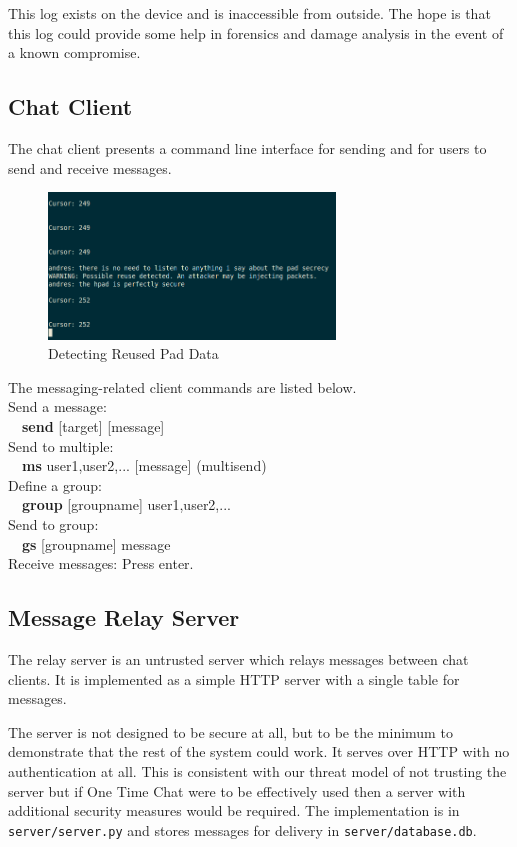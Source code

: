 \documentclass[twocolumn]{article}
\begin{document}
This log exists on the device and is inaccessible from outside.
The hope is that this log could provide some help in forensics
and damage analysis in the event of a known compromise.


\subsection{Chat Client}
The chat client presents a command line interface for sending and
 for users to send and receive messages.


\begin{figure}[htp]
\centering
\includegraphics[width=3in]{reuse}
\caption{Detecting Reused Pad Data}
\end{figure}

The messaging-related client commands are listed below.\\
Send a message:\\
\-\ \-\ \textbf{send} [target] [message]\\
Send to multiple:\\
\-\ \-\ \textbf{ms} user1,user2,... [message] (multisend)\\
Define a group:\\
\-\ \-\ \textbf{group} [groupname] user1,user2,...\\
Send to group:\\
\-\ \-\ \textbf{gs} [groupname] message\\
Receive messages:
Press enter.


\subsection{Message Relay Server}
The relay server is an untrusted server which relays messages between chat clients.
It is implemented as a simple HTTP server with a single table for messages.

The server is not designed to be secure at all, but to be the minimum to demonstrate that
the rest of the system could work. It serves over HTTP with no authentication at all.
This is consistent with our threat model of not trusting the server but if One Time Chat were to be effectively used then a server with additional security measures would be required. The implementation is in \texttt{server/server.py} and stores messages for delivery in \texttt{server/database.db}.
\end{document}

